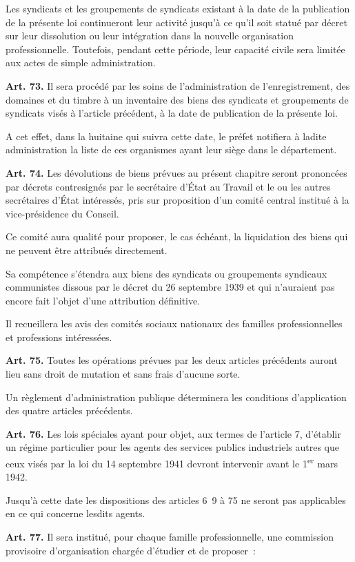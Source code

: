 \documentclass[french,twoside]{book} %
\newcommand{\labelchar}[1]{\textbf{\color{rubric} #1}}
\begin{document}
Les syndicats et les groupements de syndicats existant à la date de la publication de la présente loi continueront leur activité jusqu’à ce qu’il soit statué par décret sur leur dissolution ou leur intégration dans la nouvelle organisation professionnelle. Toutefois, pendant cette période, leur capacité civile sera limitée aux actes de simple administration.\par
\bigbreak
\noindent \labelchar{Art. 73.} Il sera procédé par les soins de l’administration de l’enregistrement, des domaines et du timbre à un inventaire des biens des syndicats et groupements de syndicats visés à l’article précédent, à la date de publication de la présente loi.\par
A cet effet, dans la huitaine qui suivra cette date, le préfet notifiera à ladite administration la liste de ces organismes ayant leur siège dans le département.\par
\bigbreak
\noindent \labelchar{Art. 74.} Les dévolutions de biens prévues au présent chapitre seront prononcées par décrets contresignés par le secrétaire d’État au Travail et le ou les autres secrétaires d’État intéressés, pris sur proposition d’un comité central institué à la vice-présidence du Conseil.\par
Ce comité aura qualité pour proposer, le cas échéant, la liquidation des biens qui ne peuvent être attribués directement.\par
Sa compétence s’étendra aux biens des syndicats ou groupements syndicaux communistes dissous par le décret du 26 septembre 1939 et qui n’auraient pas encore fait l’objet d’une attribution définitive.\par
Il recueillera les avis des comités sociaux nationaux des familles professionnelles et professions intéressées.\par
\bigbreak
\noindent \labelchar{Art. 75.} Toutes les opérations prévues par les deux articles précédents auront lieu sans droit de mutation et sans frais d’aucune sorte.\par
Un règlement d’administration publique déterminera les conditions d’application des quatre articles précédents.\par
\bigbreak
\noindent \labelchar{Art. 76.} Les lois spéciales ayant pour objet, aux termes de l’article 7, d’établir un régime particulier pour les agents des services publics industriels autres que ceux visés par la loi du 14 septembre 1941 devront intervenir avant le 1\textsuperscript{er} mars 1942.\par
Jusqu’à cette date les dispositions des articles 6 9 à 75 ne seront pas applicables en ce qui concerne lesdits agents.\par
\bigbreak
\noindent \labelchar{Art. 77.} Il sera institué, pour chaque famille professionnelle, une commission provisoire d’organisation chargée d’étudier et de proposer :\par
\end{document}
